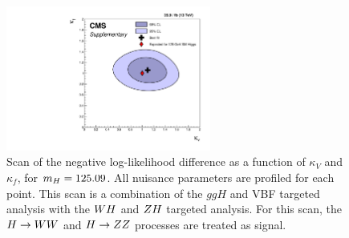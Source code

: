 \begin{figure}[!ht]
 \begin{center}
  \includegraphics[width=0.60\textwidth]{higgs_to_taus_vh/plots/combined/kFkV_HIG-18-007_plus_HIG-16-043.pdf}
 \end{center}
 \caption{Scan of the negative 
 log-likelihood difference as a function of $\kappa_V$ and $\kappa_f$, for 
 $m_{H} = 125.09$\GeV.  All nuisance parameters are profiled for each point. 
 This scan is a combination of the $ggH$ and VBF targeted analysis with the 
 $WH$ and $ZH$ targeted analysis.
 For this scan, the $H\to WW$ and $H\to ZZ$ processes 
 are treated as signal.
 }
 \label{fig:cmb_kFkV}
\end{figure}



\clearpage
